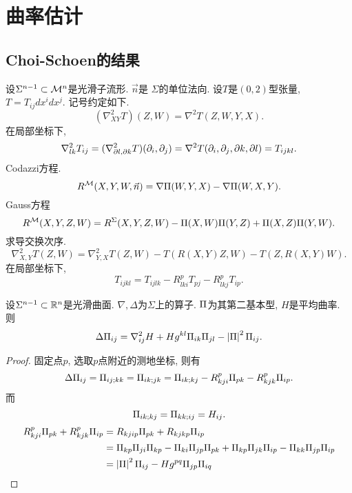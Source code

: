 \chapter{曲率估计}
\section{Choi-Schoen的结果}
设$\Sigma^{n-1} \subset {\mathcal{M}}^n$是光滑子流形. $\vec{n}$是 $\Sigma$的单位法向. 设$T$是$(0,2)$型张量, $T=T_{ij}dx^idx^j$. 记号约定如下.
\begin{equation}
    (\nabla^2_{XY}T)(Z,W)=\nabla^2T(Z,W,Y,X).
\end{equation}
在局部坐标下,
\begin{equation}
    \nabla^2_{lk}T_{ij}=(\nabla^2_{\partial l,\partial k}T)({\partial_i},{\partial_j})=\nabla^2T({\partial_i},{\partial_j}, \partial k,\partial l)=T_{ijkl}.
\end{equation}
Codazzi方程.
\begin{equation}
    R^{\mathcal{M}}(X,Y,W,\vec{n}) = \nabla {\Pi}(W,Y,X) - \nabla {\Pi} (W,X,Y).
\end{equation}
Gauss方程
\begin{equation}
    R^{\mathcal{M}}(X,Y,Z,W) = R^\Sigma(X,Y,Z,W)-{\Pi}(X,W){\Pi}(Y,Z)+{\Pi}(X,Z){\Pi}(Y,W).
\end{equation}
求导交换次序.
\begin{equation}
    \nabla^2_{X,Y}T(Z,W) = \nabla^2_{Y,X}T(Z,W)-T(R(X,Y)Z,W)-T(Z,R(X,Y)W).
\end{equation}
在局部坐标下,
\begin{equation}
    T_{ijkl}=T_{ijlk}-R_{lki}^pT_{pj}-R_{lkj}^pT_{ip}.
\end{equation}
\begin{proposition}
    设$\Sigma^{n-1} \subset \mathbb{R}^n$是光滑曲面. $\nabla, \Delta$为$\Sigma$上的算子. ${\Pi}$为其第二基本型, $H$是平均曲率. 则
    \begin{equation} \label{simon1}
        \Delta {\Pi}_{ij}=\nabla^2_{ij}H + Hg^{kl}{\Pi}_{ik}{\Pi}_{jl}-\left | {\Pi} \right |^2{\Pi}_{ij}.
    \end{equation}
\end{proposition}
\begin{proof}
    固定点$p$, 选取$p$点附近的测地坐标, 则有
    \begin{equation}
        \Delta {\Pi}_{ij}={\Pi}_{ij;kk}={\Pi}_{ik;jk}={\Pi}_{ik;kj}-R_{kji}^p{\Pi}_{pk}-R_{kjk}^p{\Pi}_{ip}.
    \end{equation}
    而
    \begin{equation}
        {\Pi}_{ik;kj}={\Pi}_{kk;ij}=H_{ij}.
    \end{equation}
    \begin{equation}
        \begin{split}
            R_{kji}^p{\Pi}_{pk}+R_{kjk}^p{\Pi}_{ip} &= R_{kjip}{\Pi}_{pk}+R_{kjkp}{\Pi}_{ip}\\
            &={\Pi}_{kp}{\Pi}_{ji}{\Pi}_{kp}-{\Pi}_{ki}{\Pi}_{jp}{\Pi}_{pk}+{\Pi}_{kp}{\Pi}_{jk}{\Pi}_{ip}-{\Pi}_{kk}{\Pi}_{jp}{\Pi}_{ip} \\
            &=\left | {\Pi} \right |^2{\Pi}_{ij}-Hg^{pq}{\Pi}_{jp}{\Pi}_{iq}
        \end{split}
    \end{equation}
\end{proof}
